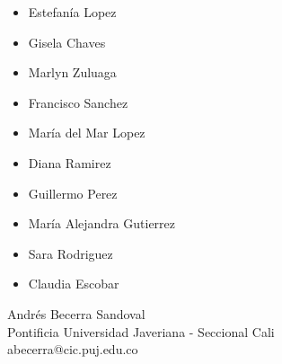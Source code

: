 \begin{itemize}
   \item Estefanía Lopez 
   \item Gisela Chaves 
   \item Marlyn Zuluaga 
   \item Francisco Sanchez
   \item María del Mar Lopez
   \item Diana Ramirez
   \item Guillermo Perez
   \item María Alejandra Gutierrez
   \item Sara Rodriguez
   \item Claudia Escobar 
\end{itemize}

\vspace{0.25in}
\begin{flushleft}
Andrés Becerra Sandoval \\
Pontificia Universidad Javeriana - Seccional Cali \\
abecerra@cic.puj.edu.co \\

\end{flushleft}


